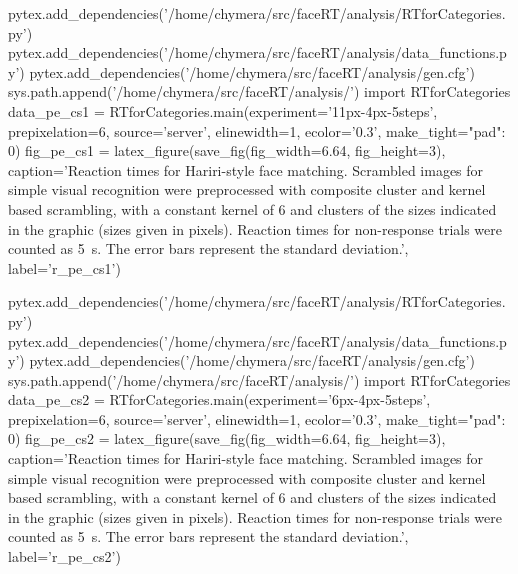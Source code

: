 \begin{pycode}
pytex.add_dependencies('/home/chymera/src/faceRT/analysis/RTforCategories.py')
pytex.add_dependencies('/home/chymera/src/faceRT/analysis/data_functions.py')
pytex.add_dependencies('/home/chymera/src/faceRT/analysis/gen.cfg')
sys.path.append('/home/chymera/src/faceRT/analysis/')
import RTforCategories
data_pe_cs1 = RTforCategories.main(experiment='11px-4px-5steps', prepixelation=6, source='server', elinewidth=1, ecolor='0.3', make_tight={"pad": 0})
fig_pe_cs1 = latex_figure(save_fig(fig_width=6.64, fig_height=3), caption='Reaction times for Hariri-style face matching. Scrambled images for simple visual recognition were preprocessed with composite cluster and kernel based scrambling, with a constant kernel of \SI{6}{\pixel} and clusters of the sizes indicated in the graphic (sizes given in pixels). Reaction times for non-response trials were counted as \SI{5}{\second}. The error bars represent the standard deviation.', label='r_pe_cs1')
\end{pycode}
\begin{pycode}
pytex.add_dependencies('/home/chymera/src/faceRT/analysis/RTforCategories.py')
pytex.add_dependencies('/home/chymera/src/faceRT/analysis/data_functions.py')
pytex.add_dependencies('/home/chymera/src/faceRT/analysis/gen.cfg')
sys.path.append('/home/chymera/src/faceRT/analysis/')
import RTforCategories
data_pe_cs2 = RTforCategories.main(experiment='6px-4px-5steps', prepixelation=6, source='server', elinewidth=1, ecolor='0.3', make_tight={"pad": 0})
fig_pe_cs2 = latex_figure(save_fig(fig_width=6.64, fig_height=3), caption='Reaction times for Hariri-style face matching. Scrambled images for simple visual recognition were preprocessed with composite cluster and kernel based scrambling, with a constant kernel of \SI{6}{\pixel} and clusters of the sizes indicated in the graphic (sizes given in pixels). Reaction times for non-response trials were counted as \SI{5}{\second}. The error bars represent the standard deviation.', label='r_pe_cs2')
\end{pycode}
